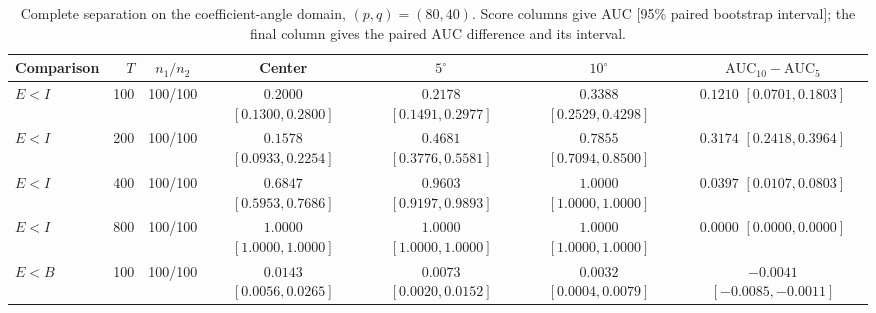 \documentclass[12pt,letterpaper]{article}
\def\spacingset#1{\renewcommand{\baselinestretch}{#1}\small\normalsize}
\theoremstyle{plain}
\theoremstyle{definition}
\begin{document}
\begin{table}[p]
\begingroup
\spacingset{1.0}
\small\centering
\caption{Complete separation on the coefficient-angle domain, $(p,q)=(80,40)$. Score columns give AUC [95\% paired bootstrap interval]; the final column gives the paired AUC difference and its interval.}
\label{s23:lambda:allauc:p80q40}
\footnotesize
\setlength{\tabcolsep}{3.5pt}
\renewcommand{\arraystretch}{1.10}
\begin{adjustbox}{max width=\linewidth}
\begin{tabular}{lrccccc}
\toprule
Comparison & $T$ & $n_1/n_2$ & Center & $5^\circ$ & $10^\circ$ & $\mathrm{AUC}_{10}-\mathrm{AUC}_{5}$\\
\midrule
$E<I$ & 100 & 100/100 & \shortstack{$0.2000$\\{\scriptsize$[0.1300,0.2800]$}} & \shortstack{$0.2178$\\{\scriptsize$[0.1491,0.2977]$}} & \shortstack{$0.3388$\\{\scriptsize$[0.2529,0.4298]$}} & \shortstack{$0.1210$\\{\scriptsize$[0.0701,0.1803]$}}\\
$E<I$ & 200 & 100/100 & \shortstack{$0.1578$\\{\scriptsize$[0.0933,0.2254]$}} & \shortstack{$0.4681$\\{\scriptsize$[0.3776,0.5581]$}} & \shortstack{$0.7855$\\{\scriptsize$[0.7094,0.8500]$}} & \shortstack{$0.3174$\\{\scriptsize$[0.2418,0.3964]$}}\\
$E<I$ & 400 & 100/100 & \shortstack{$0.6847$\\{\scriptsize$[0.5953,0.7686]$}} & \shortstack{$0.9603$\\{\scriptsize$[0.9197,0.9893]$}} & \shortstack{$1.0000$\\{\scriptsize$[1.0000,1.0000]$}} & \shortstack{$0.0397$\\{\scriptsize$[0.0107,0.0803]$}}\\
$E<I$ & 800 & 100/100 & \shortstack{$1.0000$\\{\scriptsize$[1.0000,1.0000]$}} & \shortstack{$1.0000$\\{\scriptsize$[1.0000,1.0000]$}} & \shortstack{$1.0000$\\{\scriptsize$[1.0000,1.0000]$}} & \shortstack{$0.0000$\\{\scriptsize$[0.0000,0.0000]$}}\\
\addlinespace
$E<B$ & 100 & 100/100 & \shortstack{$0.0143$\\{\scriptsize$[0.0056,0.0265]$}} & \shortstack{$0.0073$\\{\scriptsize$[0.0020,0.0152]$}} & \shortstack{$0.0032$\\{\scriptsize$[0.0004,0.0079]$}} & \shortstack{$-0.0041$\\{\scriptsize$[-0.0085,-0.0011]$}}\\

\end{tabular}
\end{adjustbox}
\end{table}
\end{document}
